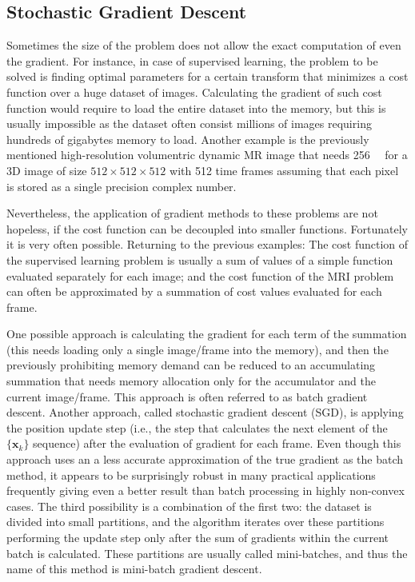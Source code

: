 \subsection{Stochastic Gradient Descent}
Sometimes the size of the problem does not allow the exact computation of even the gradient. For instance, in case of supervised learning, the problem to be solved is finding optimal parameters for a certain transform that minimizes a cost function over a huge dataset of images. Calculating the gradient of such cost function would require to load the entire dataset into the memory, but this is usually impossible as the dataset often consist millions of images requiring hundreds of gigabytes memory to load. Another example is the previously mentioned high-resolution volumentric dynamic MR image that needs \SI{256}{\gibi\byte} for a 3D image of size $512\times512\times512$ with 512 time frames assuming that each pixel is stored as a single precision complex number.

Nevertheless, the application of gradient methods to these problems are not hopeless, if the cost function can be decoupled into smaller functions. Fortunately it is very often possible. Returning to the previous examples: The cost function of the supervised learning problem is usually a sum of values of a simple function evaluated separately for each image; and the cost function of the MRI problem can often be approximated by a summation of cost values evaluated for each frame.

One possible approach is calculating the gradient for each term of the summation (this needs loading only a single image/frame into the memory), and then the previously prohibiting memory demand can be reduced to an accumulating summation that needs memory allocation only for the accumulator and the current image/frame. This approach is often referred to as batch gradient descent. Another approach, called stochastic gradient descent (SGD), is applying the position update step (i.e., the step that calculates the next element of the $\{\mathbf{x}_k\}$ sequence) after the evaluation of gradient for each frame. Even though this approach uses an a less accurate approximation of the true gradient as the batch method, it appears to be surprisingly robust in many practical applications frequently giving even a better result than batch processing in highly non-convex cases. The third possibility is a combination of the first two: the dataset is divided into small partitions, and the algorithm iterates over these partitions performing the update step only after the sum of gradients within the current batch is calculated. These partitions are usually called mini-batches, and thus the name of this method is mini-batch gradient descent.

